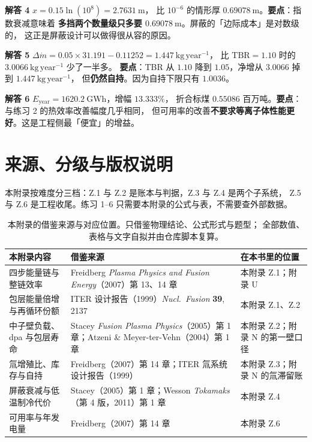 \textbf{解答 4} $x = 0.15\ln(10^{8}) = 2.7631\ \mathrm{m}$，
比 $10^{-6}$ 的情形厚 $0.69078\ \mathrm{m}$。\textbf{要点}：指数衰减意味着
\textbf{多挡两个数量级只多要 $0.69078\ \mathrm{m}$}。屏蔽的「边际成本」是对数级的，
这正是屏蔽设计可以做得很从容的原因。

\textbf{解答 5} $\Delta\dot m = 0.05\times31.191 - 0.11252 = 1.447\ \mathrm{kg\,year^{-1}}$，
比 $\mathrm{TBR}=1.10$ 时的 $3.0066\ \mathrm{kg\,year^{-1}}$ 少了一半多。
\textbf{要点}：TBR 从 $1.10$ 降到 $1.05$，净增从 $3.0066$ 掉到 $1.447\ \mathrm{kg\,year^{-1}}$，
但\textbf{仍然自持}。因为自持下限只有 $1.0036$。

\textbf{解答 6} $E_{\mathrm{year}} = 1620.2\ \mathrm{GWh}$，增幅 $13.333\%$，
折合标煤 $0.55086$ 百万吨。\textbf{要点}：与练习 2 的热效率改善幅度几乎相同，
但可用率的改善\textbf{不要求等离子体性能更好}。这是工程侧最「便宜」的增益。

\section{来源、分级与版权说明}
\label{sec:app-z-source}

\begingroup\small
本附录按难度分三档：Z.1 与 Z.2 是账本与判据，Z.3 与 Z.4 是两个子系统，
Z.5 与 Z.6 是工程收尾。练习 1--6 只需要本附录的公式与表，不需要查外部数据。

\begin{table}[htbp]
\centering
\small
\caption{本附录的借鉴来源与对应位置。只借鉴物理结论、公式形式与题型；
全部数值、表格与文字自拟并由仓库脚本复算。}
\label{tab:app-z-source}
\begin{tabular}{p{3.4cm}p{5.6cm}p{3.6cm}}
\toprule
本附录内容 & 借鉴来源 & 在本书里的位置 \\
\midrule
四步能量链与整链效率 &
Freidberg \emph{Plasma Physics and Fusion Energy}（2007）第 13、14 章 &
本附录 Z.1；附录 U \\
包层能量倍增与再循环份额 &
ITER 设计报告（1999）\emph{Nucl.\ Fusion} \textbf{39}, 2137 &
本附录 Z.1、Z.2 \\
中子壁负载、dpa 与包层寿命 &
Stacey \emph{Fusion Plasma Physics}（2005）第 1 章；Atzeni \& Meyer-ter-Vehn（2004）第 1 章 &
本附录 Z.2；附录 N 的第一壁口径 \\
氚增殖比、库存与自持 &
Freidberg（2007）第 14 章；ITER 氚系统设计报告（1999） &
本附录 Z.3；附录 N 的氚滞留账 \\
屏蔽衰减与低温制冷代价 &
Stacey（2005）第 1 章；Wesson \emph{Tokamaks}（第 4 版，2011）第 1 章 &
本附录 Z.4 \\
可用率与年发电量 &
Freidberg（2007）第 14 章 &
本附录 Z.6 \\
\bottomrule
\end{tabular}

\end{table}

